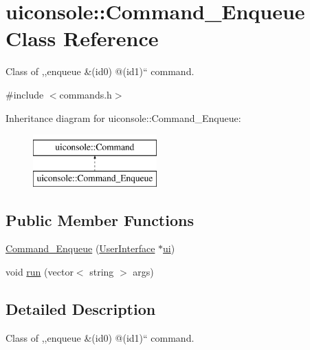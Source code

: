 \hypertarget{classuiconsole_1_1Command__Enqueue}{
\section{uiconsole::Command\_\-Enqueue Class Reference}
\label{da/d43/classuiconsole_1_1Command__Enqueue}
}


Class of ,,enqueue \&(id0) @(id1)`` command.  




{\ttfamily \#include $<$commands.h$>$}

Inheritance diagram for uiconsole::Command\_\-Enqueue:\begin{figure}[H]
\begin{center}
\leavevmode
\includegraphics[height=2.000000cm]{da/d43/classuiconsole_1_1Command__Enqueue}
\end{center}
\end{figure}
\subsection*{Public Member Functions}
\begin{DoxyCompactItemize}
\item 
\hyperlink{classuiconsole_1_1Command__Enqueue_ac29b7ad041516806ac7b7398da2dc811}{Command\_\-Enqueue} (\hyperlink{classUserInterface}{UserInterface} $\ast$\hyperlink{classuiconsole_1_1Command_ab43ed5152860c099f858d62f9f556699}{ui})
\item 
void \hyperlink{classuiconsole_1_1Command__Enqueue_a62ddd6ebdd0412b4d109d56e48ec1f9e}{run} (vector$<$ string $>$ args)
\end{DoxyCompactItemize}


\subsection{Detailed Description}
Class of ,,enqueue \&(id0) @(id1)`` command. 

